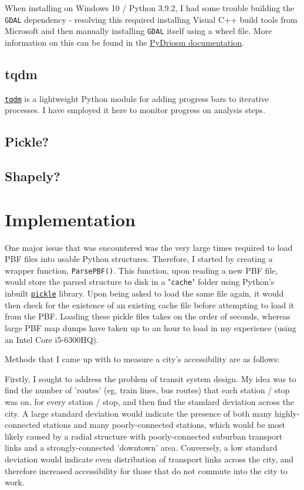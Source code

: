 \documentclass[11pt]{article} %
\begin{document}
When installing on Windows 10 / Python 3.9.2, I had some trouble building the \texttt{GDAL} dependency - resolving this required installing Visual C++ build tools from Microsoft and then manually installing \texttt{GDAL} itself using a wheel file. More information on this can be found in the \href{https://pydriosm.readthedocs.io/en/latest/installation.html}{PyDriosm documentation}.

\subsection{tqdm}
\href{https://tqdm.github.io/}{\texttt{tqdm}} is a lightweight Python module for adding progress bars to iterative processes. I have employed it here to monitor progress on analysis steps.

\subsection{Pickle?}

\subsection{Shapely?}


\section{Implementation}
One major issue that was encountered was the very large times required to load PBF files into usable Python structures. Therefore, I started by creating a wrapper function, \texttt{ParsePBF()}. This function, upon reading a new PBF file, would store the parsed structure to disk in a "\texttt{cache}" folder using Python's inbuilt \href{https://docs.python.org/3/library/pickle.html}{\texttt{pickle}} library. Upon being asked to load the same file again, it would then check for the existence of an existing cache file before attempting to load it from the PBF. Loading these pickle files takes on the order of seconds, whereas large PBF map dumps have taken up to an hour to load in my experience (using an Intel Core i5-6300HQ).

Methods that I came up with to measure a city's accessibility are as follows:

Firstly, I sought to address the problem of transit system design. My idea was to find the number of 'routes' (eg, train lines, bus routes) that each station / stop was on, for every station / stop, and then find the standard deviation across the city. A large standard deviation would indicate the presence of both many highly-connected stations and many poorly-connected stations, which would be most likely caused by a radial structure with poorly-connected suburban transport links and a strongly-connected 'downtown' area. Conversely, a low standard deviation would indicate even distribution of transport links across the city, and therefore increased accessibility for those that do not commute into the city to work.
\end{document}
